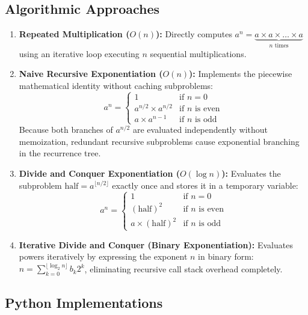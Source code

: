 \documentclass[12pt]{article}
\begin{document}
\subsection{Algorithmic Approaches}
\begin{enumerate}
    \item \textbf{Repeated Multiplication ($O(n)$):}
    Directly computes $a^n = \underbrace{a \times a \times \dots \times a}_{n \text{ times}}$ using an iterative loop executing $n$ sequential multiplications.
    \item \textbf{Naive Recursive Exponentiation ($O(n)$):}
    Implements the piecewise mathematical identity without caching subproblems:
    \begin{equation}
        a^n = \begin{cases}
            1 & \text{if } n = 0 \\
            a^{n/2} \times a^{n/2} & \text{if } n \text{ is even} \\
            a \times a^{n-1} & \text{if } n \text{ is odd}
        \end{cases}
    \end{equation}
    Because both branches of $a^{n/2}$ are evaluated independently without memoization, redundant recursive subproblems cause exponential branching in the recurrence tree.
    \item \textbf{Divide and Conquer Exponentiation ($O(\log n)$):}
    Evaluates the subproblem $\text{half} = a^{\lfloor n/2 \rfloor}$ exactly once and stores it in a temporary variable:
    \begin{equation}
        a^n = \begin{cases}
            1 & \text{if } n = 0 \\
            (\text{half})^2 & \text{if } n \text{ is even} \\
            a \times (\text{half})^2 & \text{if } n \text{ is odd}
        \end{cases}
    \end{equation}
    \item \textbf{Iterative Divide and Conquer (Binary Exponentiation):}
    Evaluates powers iteratively by expressing the exponent $n$ in binary form: $n = \sum_{k=0}^{\lfloor \log_2 n \rfloor} b_k 2^k$, eliminating recursive call stack overhead completely.
\end{enumerate}

\subsection{Python Implementations}
\end{document}
